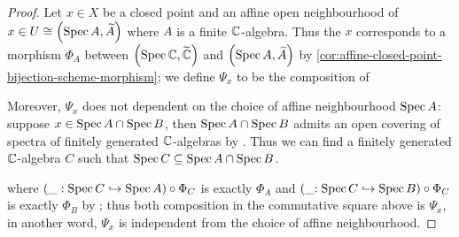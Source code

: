 \begin{proof}
  Let $x \in X$ be a closed point and an affine open neighbourhood of $x \in U \cong \left(\operatorname*{Spec}{A}, \widetilde{A}\right)$ where $A$ is a finite $\mathbb{C}$-algebra. Thus the $x$ corresponds to a morphism $\Phi_{A}$ between $\left(\operatorname*{Spec}{\mathbb{C}}, \widetilde{\mathbb{C}}\right)$ and $\left(\operatorname*{Spec}{A}, \widetilde{A}\right)$ by \cref{cor:affine-closed-point-bijection-scheme-morphism}; we define $\Psi_{x}$ to be the composition of
  \begin{center}
  \end{center}
  Moreover, $\Psi_{x}$ does not dependent on the choice of affine neighbourhood $\operatorname{Spec} A$: suppose $x \in \operatorname{Spec} A \cap \operatorname{Spec} B$, then $\operatorname{Spec} A \cap \operatorname{Spec} B$ admits an open covering of spectra of finitely generated $\mathbb{C}$-algebras by . Thus we can find a finitely generated $\mathbb{C}$-algebra $C$ such that $\operatorname{Spec} C \subseteq \operatorname{Spec} A \cap \operatorname{Spec} B$.
  \begin{center}
  \end{center}
  where $ (\_: \operatorname{Spec} C \hookrightarrow \operatorname{Spec} A) \circ \Phi_{C}$ is exactly $\Phi_{A}$ and $(\_{: \operatorname{Spec} C \hookrightarrow \operatorname{Spec} B}) \circ \Phi_{C}$ is exactly $\Phi_{B}$ by ; thus both composition in the commutative square above is $\Psi_{x}$, in another word, $\Psi_{x}$ is independent from the choice of affine neighbourhood.


\end{proof}
